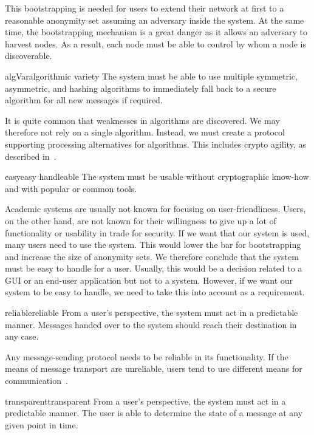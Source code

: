 This bootstrapping is needed for users to extend their network at first to a reasonable anonymity set assuming an adversary inside the system. At the same time, the bootstrapping mechanism is a great danger as it allows an adversary to harvest nodes. As a result, each node must be able to control by whom a node is discoverable.

\begin{requirement}{algVar}{algorithmic variety}
	The system must be able to use multiple symmetric, asymmetric, and hashing algorithms to immediately fall back to a secure algorithm for all new messages if required. 
\end{requirement}

It is quite common that weaknesses in algorithms are discovered. We may therefore not rely on a single algorithm. Instead, we must create a protocol supporting processing alternatives for algorithms. This includes crypto agility, as described in~\cite{bsiPostQuantum}.

\begin{requirement}{easy}{easy handleable}
	The system must be usable without cryptographic know-how and with popular or common tools.
\end{requirement}

Academic systems are usually not known for focusing on user-friendliness. Users, on the other hand, are not known for their willingness to give up a lot of functionality or usability in trade for security. If we want that our system is used, many users need to use the system. This would lower the bar for bootstrapping and increase the size of anonymity sets. We therefore conclude that the system must be easy to handle for a user. Usually, this would be a decision related to a GUI or an end-user application but not to a system. However, if we want our system to be easy to handle, we need to take this into account as a requirement.

\begin{requirement}{reliable}{reliable}
	From a user's perspective, the system must act in a predictable manner. Messages handed over to the system should reach their destination in any case.
\end{requirement}

Any message-sending protocol needs to be reliable in its functionality. If the means of message transport are unreliable, users tend to use different means for communication~\cite{zhou2011examining}. 

\begin{requirement}{transparent}{transparent}
	From a user's perspective, the system must act in a predictable manner. The user is able to determine the state of a message at any given point in time.
\end{requirement}

